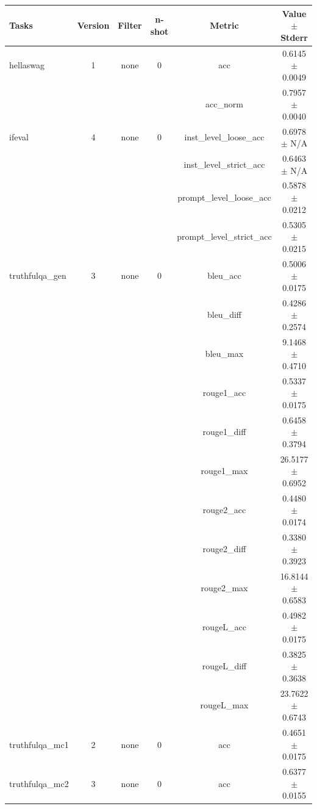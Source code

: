 \documentclass{ifacconf}
\begin{document}
\begin{strip}
\begin{minipage}{\textwidth}
			\begin{table}[H]
				\centering
				\begin{tabular}{|l|c|c|c|c|c|}
					\hline
					\textbf{Tasks} & \textbf{Version} & \textbf{Filter} & \textbf{n-shot} & \textbf{Metric} & \textbf{Value} $\pm$ \textbf{Stderr} \\ \hline
					hellaswag & 1 & none & 0 & acc & 0.6145 $\pm$ 0.0049 \\ \hline
					& & & & acc\_norm & 0.7957 $\pm$ 0.0040 \\ \hline
					ifeval & 4 & none & 0 & inst\_level\_loose\_acc & 0.6978 $\pm$ N/A \\ \hline
					& & & & inst\_level\_strict\_acc & 0.6463 $\pm$ N/A \\ \hline
					& & & & prompt\_level\_loose\_acc & 0.5878 $\pm$ 0.0212 \\ \hline
					& & & & prompt\_level\_strict\_acc & 0.5305 $\pm$ 0.0215 \\ \hline
					truthfulqa\_gen & 3 & none & 0 & bleu\_acc & 0.5006 $\pm$ 0.0175 \\ \hline
					& & & & bleu\_diff & 0.4286 $\pm$ 0.2574 \\ \hline
					& & & & bleu\_max & 9.1468 $\pm$ 0.4710 \\ \hline
					& & & & rouge1\_acc & 0.5337 $\pm$ 0.0175 \\ \hline
					& & & & rouge1\_diff & 0.6458 $\pm$ 0.3794 \\ \hline
					& & & & rouge1\_max & 26.5177 $\pm$ 0.6952 \\ \hline
					& & & & rouge2\_acc & 0.4480 $\pm$ 0.0174 \\ \hline
					& & & & rouge2\_diff & 0.3380 $\pm$ 0.3923 \\ \hline
					& & & & rouge2\_max & 16.8144 $\pm$ 0.6583 \\ \hline
					& & & & rougeL\_acc & 0.4982 $\pm$ 0.0175 \\ \hline
					& & & & rougeL\_diff & 0.3825 $\pm$ 0.3638 \\ \hline
					& & & & rougeL\_max & 23.7622 $\pm$ 0.6743 \\ \hline
					truthfulqa\_mc1 & 2 & none & 0 & acc & 0.4651 $\pm$ 0.0175 \\ \hline
					truthfulqa\_mc2 & 3 & none & 0 & acc & 0.6377 $\pm$ 0.0155 \\ \hline
				\end{tabular}
				\label{tab:qwen25_awq}
			\end{table}
		\end{minipage}
	\end{strip}
	
\end{document}
